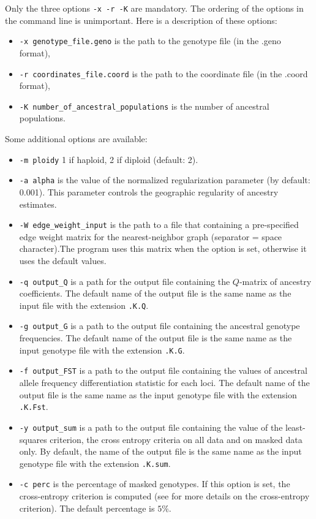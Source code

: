 \documentclass[10pt,a4paper]{article}
\begin{document}
\noindent
Only the three options {\tt -x -r -K}  are mandatory. The ordering of the options in the command line is unimportant. Here is a description of these options:
\begin{itemize}
\item \verb|-x genotype_file.geno| is the path to the genotype file (in the .geno format),
\item \verb|-r coordinates_file.coord| is the path to the coordinate file (in the .coord format),
\item \verb|-K number_of_ancestral_populations| is the number of ancestral populations.
\end{itemize}

\noindent
Some additional options are available:
\begin{itemize}
\item \verb|-m ploidy|  1 if haploid, 2 if diploid (default: 2). 
\item \verb|-a alpha| is the value of the normalized regularization parameter (by default: 0.001). This parameter controls the geographic regularity of ancestry estimates.
\item \verb|-W edge_weight_input| is the path to a file that containing a pre-specified edge weight matrix for the nearest-neighbor graph (separator = space character).The program uses this matrix when the option is set, otherwise it uses the default values.
\item \verb|-q output_Q| is a path for the output file containing the $Q$-matrix of ancestry coefficients. The default name of the output file is the same name as the input file with the extension {\tt .K.Q}.
\item \verb|-g output_G| is a path to the output file containing the ancestral genotype frequencies. The default name of the output file is the same name as the input genotype file with the extension {\tt .K.G}.
\item \verb|-f output_FST| is a path to the output file containing the values of ancestral allele frequency differentiation statistic for each loci. The default name of the output file is the same name as the input genotype file with the extension {\tt .K.Fst}.
\item \verb|-y output_sum| is a path to the output file containing the value of the least-squares criterion, the cross entropy criteria on all data and on masked data only. By default, the name of the output file is the same name as the input genotype file with the extension {\tt .K.sum}.
\item \verb|-c perc| is the percentage of masked genotypes. If this option is set, the cross-entropy criterion is computed (see\cite{frichot2014fast} for more details on the cross-entropy criterion). The default percentage is $5\%$.

\end{itemize}
\end{document}
